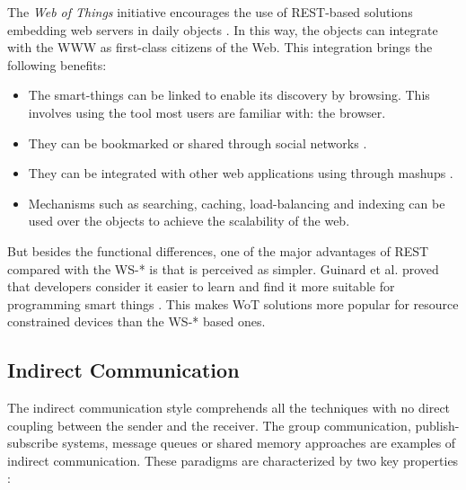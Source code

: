 The \emph{Web of Things} initiative encourages the use of REST-based solutions embedding web servers in daily objects \cite{guinard_internet_2011}.
In this way, the objects can integrate with the WWW as first-class citizens of the Web.
This integration brings the following benefits:
\begin{itemize}
  \item The smart-things can be linked to enable its discovery by browsing. This involves using the tool most users are familiar with: the browser.
  \item They can be bookmarked or shared through social networks \cite{guinard_sharing_2010}.
  \item They can be integrated with other web applications using through mashups \cite{ostermaier_webplug:_2010}. %
  \item Mechanisms such as searching, caching, load-balancing and indexing can be used over the objects to achieve the scalability of the web. %
\end{itemize}


But besides the functional differences, one of the major advantages of REST compared with the WS-* is that is perceived as simpler.
Guinard et al. proved that developers consider it easier to learn and find it more suitable for programming smart things \cite{}.
This makes WoT solutions more popular for resource constrained devices than the WS-* based ones.







\subsection{Indirect Communication}
\label{sec:indirect_communication}

The indirect communication style comprehends all the techniques with no direct coupling between the sender and the receiver.
The group communication, publish-subscribe systems, message queues or shared memory approaches are examples of indirect communication.
These paradigms are characterized by two key properties \cite{coulouris_distributed_2012}:

